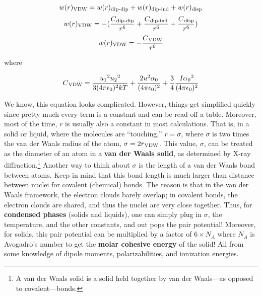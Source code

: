 \begin{equation}
    w(r)\textsubscript{VDW}=w(r)\textsubscript{dip-dip}+w(r)\textsubscript{dip-ind}+w(r)\textsubscript{disp}
\end{equation}
\begin{equation}
    w(r)\textsubscript{VDW}=-(\frac{C\textsubscript{dip-dip}}{r^{6}}+\frac{C\textsubscript{dip-ind}}{r^6}+\frac{C\textsubscript{disp}}{r^{6}})
\end{equation}
\begin{equation}
    w(r)\textsubscript{VDW}=-\frac{C\textsubscript{VDW}}{r^{6}}
\end{equation}

where

\begin{equation}
    C\textsubscript{VDW}=\frac{u\textsubscript{1}^{2}u\textsubscript{2}^{2}}{3(4\pi\epsilon\textsubscript{0})^{2}kT}+\frac{2u^{2}\alpha\textsubscript{0}}{(4\pi\epsilon\textsubscript{0})^{2}}+\frac{3}{4}\frac{I\alpha\textsubscript{0}^{2}}{(4\pi\epsilon\textsubscript{0})^{2}}
\end{equation}

We know, this equation looks complicated. However, things get simplified quickly since pretty much every term is a constant and can be read off a table. Moreover, most of the time, $r$ is usually also a constant in most calculations. That is, in a solid or liquid, where the molecules are ``touching,'' $r = \sigma$, where $\sigma$ is two times the van der Waals radius of the atom, $\sigma=2r\textsubscript{VDW}$. This value, $\sigma$, can be treated as the diameter of an atom in a \textbf{van der Waals solid}, as determined by X-ray diffraction.\footnote{A van der Waals solid is a solid held together by van der Waals---as opposed to covalent---bonds.} Another way to think about $\sigma$ is the length of a van der Waals bond between atoms. Keep in mind that this bond length is much larger than distance between nuclei for covalent (chemical) bonds. The reason is that in the van der Waals framework, the electron clouds barely overlap; in covalent bonds, the electron clouds are shared, and thus the nuclei are very close together. Thus, for \textbf{condensed phases} (solids and liquids), one can simply plug in $\sigma$, the temperature, and the other constants, and out pops the pair potential! Moreover, for solids, this pair potential can be multiplied by a factor of $6 \times N_A$ where $N_A$ is Avogadro's number to get the \textbf{molar cohesive energy} of the solid! All from some knowledge of dipole moments, polarizabilities, and ionization energies.

